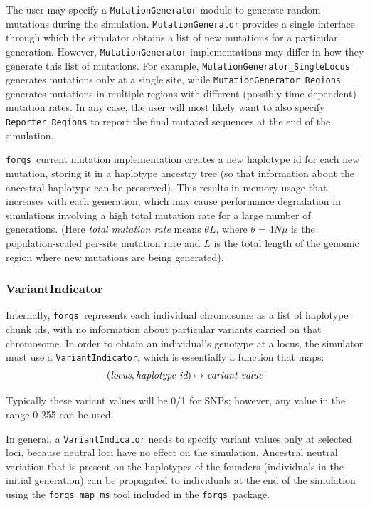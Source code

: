 \documentclass{article}
\newcommand{\forqs}[0]{\texttt{forqs }}
\begin{document}
The user may specify a \texttt{MutationGenerator} module to generate random
mutations during the simulation.  \texttt{MutationGenerator} provides a single
interface through which the simulator obtains a list of new mutations for a
particular generation.  However, \texttt{MutationGenerator} implementations may
differ in how they generate this list of mutations.  For example,
\texttt{Mutation\-Generator\_Single\-Locus} generates mutations only at a
single site, while \texttt{MutationGenerator\_Regions} generates mutations in
multiple regions with different (possibly time-dependent) mutation rates.  In
any case, the user will most likely want to also specify
\texttt{Reporter\_Regions} to report the final mutated sequences at the end of
the simulation.

\forqs current mutation implementation creates a new haplotype id for each new
mutation, storing it in a haplotype ancestry tree (so that information about
the ancestral haplotype can be preserved).  This results in memory usage that
increases with each generation, which may cause performance degradation in
simulations involving a high total mutation rate for a large number of
generations.  (Here \emph{total mutation rate} means $\theta L$, where $\theta
= 4N\mu$ is the population-scaled per-site mutation rate and $L$ is the total
length of the genomic region where new mutations are being generated).


\subsubsection{VariantIndicator}
\label{subsection_variant_indicator}

Internally, \forqs represents each individual chromosome as a list of haplotype
chunk ids, with no information about particular variants carried on that
chromosome.  In order to obtain an individual's genotype at a locus, the
simulator must use a \texttt{VariantIndicator}, which is essentially a function
that maps:
\begin{align*}
    (\emph{locus}, \emph{haplotype id}) \mapsto \emph{variant value}
\end{align*}

Typically these variant values will be 0/1 for SNPs; however, any
value in the range 0-255 can be used.  

In general, a \texttt{VariantIndicator} needs to specify variant values only at
selected loci, because neutral loci have no effect on the simulation.
Ancestral neutral variation that is present on the haplotypes of the founders
(individuals in the initial generation) can be propagated to individuals at the
end of the simulation using the \texttt{forqs\_map\_ms} tool included in the
\forqs package.
\end{document}
